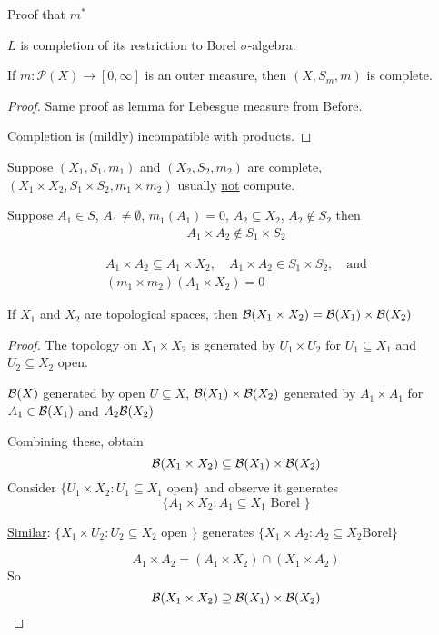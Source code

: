 Proof that $m^*$ 

\begin{corollary}
	$L$ is completion of its restriction to Borel $\sigma$-algebra.
\end{corollary}

\begin{theorem}
	If $m : \mathcal{P}(X) \to [0,\infty]$ is an outer measure, then $(X,S_m, m)$ is complete.
\end{theorem}

\begin{proof}
	Same proof as lemma for Lebesgue measure from Before.

	Completion is (mildly) incompatible with products.
\end{proof}

\begin{example}
	Suppose $(X_1, S_1, m_1)$ and  $(X_2, S_2, m_2)$ are complete, 
	$(X_1 \times X_2, S_1 \times S_2, m_1 \times m_2)$ usually \underline{not} compute.
\end{example}

Suppose $A_1 \in S$, $A_1 \neq \emptyset$,  $m_1(A_1) = 0$,  $A_2 \subseteq X_2$, $A_2 \notin S_2$
then
\begin{align*}
	A_1 \times A_2 \notin S_1 \times S_2
\end{align*}

\begin{align*}
	A_1 \times A_2 \subseteq A_1 \times X_2, \quad A_1 \times A_2 \in S_1 \times S_2, \quad \text{and} \\
	(m_1 \times m_2) (A_1 \times X_2) = 0
\end{align*}

\begin{lemma}
	If $X_1$ and $X_2$ are topological spaces, then $\mathcal{B}(X_1 \times X_2) = \mathcal{B}(X_1) \times \mathcal{B}(X_2)$
\end{lemma}

\begin{proof}
	The topology on $X_1 \times X_2$ is generated by $U_1 \times U_2$ for $U_1 \subseteq X_1$ and $U_2 \subseteq X_2$ open.

	$\mathcal{B}(X)$ generated by open $U \subseteq X$, $\mathcal{B}(X_1) \times \mathcal{B}(X_2)$ generated by $A_1 \times A_1$ for 
	$A_1 \in \mathcal{B}(X_1)$ and $A_2 \mathcal{B}(X_2)$

	Combining these, obtain
	 \[
		\mathcal{B}(X_1 \times X_2) \subseteq \mathcal{B}(X_1) \times \mathcal{B}(X_2)
	\] 
	Consider $\{U_1 \times X_2 : U_1 \subseteq X_1 \text{ open} \}$
	and observe it generates 
	\[
		\{A_1 \times X_2 : A_1 \subseteq X_1 \text{ Borel } \}
	\] 

	\underline{Similar}: $\{ X_1 \times U_2 : U_2 \subseteq X_2 \text{ open }\}$ 
	generates $\{ X_1 \times A_2 : A_2 \subseteq X_2 \text{Borel} \}$

	\[
		A_1 \times A_2 = (A_1 \times X_2 ) \cap (X_1 \times A_2)
	\] So
	\[
		\mathcal{B}(X_1 \times X_2 ) \supseteq \mathcal{B}(X_1) \times \mathcal{B}(X_2)
	\] 
\end{proof}

